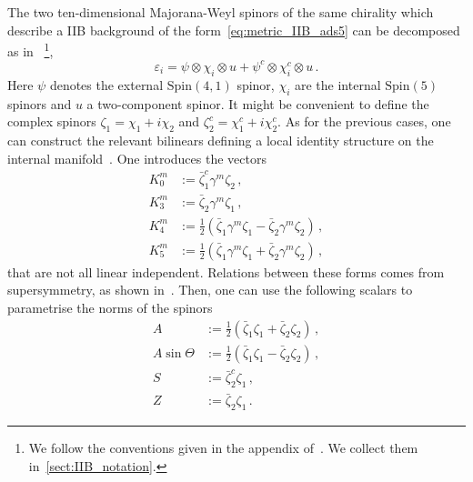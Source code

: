 \documentclass[debug]{phd}
\begin{document}
%
%
%
%
The two ten-dimensional Majorana-Weyl spinors of the same chirality which describe a IIB background of the form~\eqref{eq:metric_IIB_ads5} can be decomposed as in~\cite{Grana_Ntokos}%
		\footnote{%
		We follow the conventions given in the appendix of~\cite{Grana_Ntokos}.
		We collect them in~\cref{sect:IIB_notation}.
		},
%	
	\begin{equation} 
	\label{eq:splitting_IIB_ads5}
		\varepsilon_i= \psi \otimes \chi_i \otimes u + \psi^c \otimes \chi_i^c \otimes u\, . 
	\end{equation} 
Here $\psi$ denotes the external $\mathrm{Spin(4,1)}$ spinor, $\chi_i$ are the internal $\mathrm{Spin}(5)$ spinors and $u$ a two-component spinor. 
It might be convenient to define the complex spinors $\zeta_1 = \chi_1 + i \chi_2$ and $\zeta_2^c = \chi_1^c + i \chi_2^c$.
As for the previous cases, one can construct the relevant bilinears defining a local identity structure on the internal manifold~\cite{Gauntlett:2005ww}. 
One introduces the vectors
%
\begin{equation} 
\label{IIBbil}
	\begin{aligned}
 		K_0^m &:= \bar{\zeta}_1^c\gamma^m\zeta_2\, , \\
 		K^m_3 &:= \bar{\zeta}_2\gamma^m\zeta_1 \, ,\\
 		K^m_4 &:= \tfrac{1}{2}\left(\bar{\zeta}_1\gamma^m\zeta_1 - \bar{\zeta}_2\gamma^m\zeta_2\right)\, , \\
 		K^m_5 &:= \tfrac{1}{2}\left(\bar{\zeta}_1\gamma^m\zeta_1 + \bar{\zeta}_2\gamma^m\zeta_2\right)\, ,
\end{aligned}
\end{equation} 
%
that are not all linear independent. 
Relations between these forms comes from supersymmetry, as shown in~\cite{Gauntlett:2005ww}. 
Then, one can use the following scalars to parametrise the norms of the spinors
%
\begin{equation} 
\label{scalarbilIIB}
	\begin{aligned}
 		A &:= \tfrac{1}{2}\left(\bar{\zeta}_1\zeta_1 + \bar{\zeta}_2\zeta_2\right)\, , \\
		A\sin\Theta &:= \tfrac{1}{2}\left(\bar{\zeta}_1\zeta_1 - \bar{\zeta}_2\zeta_2\right)\, , \\
		S &:= \bar{\zeta}^c_2\zeta_1\, , \\
		Z &:= \bar{\zeta}_2\zeta_1\, .
	\end{aligned}
\end{equation} 
\end{document}
